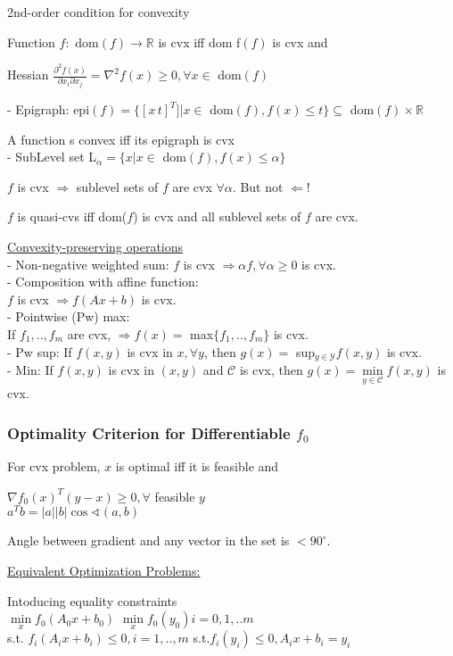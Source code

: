 \documentclass[10pt,parskip]{scrartcl}
\begin{document}
\begin{multicols*}{3}
2nd-order condition for convexity

Function $f :$ dom$(f) \rightarrow \mathbb R$ is cvx iff dom f$(f)$ is cvx and

Hessian $\frac{\partial^2 f(x)}{\partial x_i \partial x_j} =\nabla^2 f(x) \geq 0, \forall x \in $ dom$(f)$

- Epigraph: epi$(f) = \{ [x \, t]^T]|x \in$ dom$(f), f(x)\leq t\} \subseteq $ dom$(f) \times \mathbb R$

A function s convex iff its epigraph is cvx\\
- SubLevel set L$_\alpha = \{x | x \in $ dom$(f), f(x) \leq \alpha \}$

 $f$ is cvx $\Rightarrow$ sublevel sets of $f$ are cvx $\forall \alpha$. But not $\Leftarrow$!

 $f$ is quasi-cvs iff dom($f$) is cvx and all sublevel sets of $f$ are cvx.

\underline{Convexity-preserving operations}\\
- Non-negative weighted sum: $f$ is cvx $\Rightarrow \alpha f, \forall \alpha \geq 0$ is cvx.\\
- Composition with affine function:\\ $f$ is cvx $\Rightarrow f(Ax + b)$ is cvx.\\
- Pointwise (Pw) max:\\ If $f_1, .., f_m$ are cvx, $\Rightarrow f(x) = $ max$\{f_1, .., f_m\}$ is cvx.\\
- Pw sup: If $f(x,y)$ is cvx in $x, \forall y$, then $g(x) = $ sup$_{y \in \mathcal Y} f(x,y)$ is cvx.\\
- Min: If $f(x,y)$ is cvx in $(x,y)$ and $ \mathcal C$ is cvx, then $g(x) = \min \limits_{y \in \mathcal C} f(x,y) $ is cvx.

\subsubsection{Optimality Criterion for Differentiable $f_0$}
For cvx problem, $x$ is optimal iff it is feasible and

$\nabla f_0(x)^T (y-x) \geq 0, \forall$ feasible $y$ \\
 $a^T b = |a| |b| \cos \sphericalangle(a,b)$

Angle between gradient and any vector in the set is $< 90^\circ$.


\underline{Equivalent Optimization Problems:}

Intoducing equality constraints\\
$\min\limits_{x} f_0(A_0 x+ b_0)$ \hspace*{20mm} $\min\limits_{x} f_0(y_0)$\hspace*{10mm}$ i = 0,1,..m$\\
s.t. $f_i(A_i x+ b_i)\leq 0, i = 1,..,m$ \hspace*{3mm} s.t.$f_i(y_i)\leq 0, A_i x+ b_i = y_i$


\end{multicols*}
\end{document}
